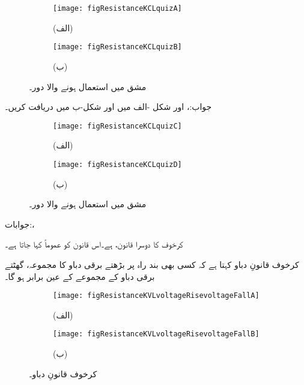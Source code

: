 \begin{figure}
\centering
\begin{subfigure}{0.34\textwidth}
\centering
\texttt{[image: figResistanceKCLquizA]}
\caption*{(الف)}
\end{subfigure}%
%
\begin{subfigure}{0.66\textwidth}
\centering
\texttt{[image: figResistanceKCLquizB]}
\caption*{(ب)}
\end{subfigure}%
\caption{مشق  میں استعمال ہونے والا دور۔}
\label{شکل_مزاحمتی_مشق_الف}
\end{figure}
جواب:،  اور 
\FloatBarrier
شکل -الف میں  اور شکل-ب میں  دریافت کریں۔
\begin{figure}[!h]
\centering
\begin{subfigure}{0.4\textwidth}
\centering
\texttt{[image: figResistanceKCLquizC]}
\caption*{(الف)}
\end{subfigure}%
%
\begin{subfigure}[scale=0.8]{0.6\textwidth}
\centering
\texttt{[image: figResistanceKCLquizD]}
\caption*{(ب)}
\end{subfigure}%
\caption{مشق  میں استعمال ہونے والا دور۔}
\label{شکل_مزاحمتی_مشق_ب}
\end{figure}

جوابات:، 
\FloatBarrier

کرخوف کا دوسرا قانون،   ہے۔اس قانون کو عموماً  کہا جاتا ہے۔

کرخوف قانونِ دباو کہتا ہے کہ کسی بھی بند راہ پر بڑھتے برقی دباو کا مجموعہ، گھٹتے برقی دباو کے مجموعے کے عین برابر ہو گا۔

\begin{figure}
\centering
\begin{subfigure}{0.5\textwidth}
\centering
\texttt{[image: figResistanceKVLvoltageRisevoltageFallA]}
\caption*{(الف)}
\end{subfigure}%
%
\begin{subfigure}{0.5\textwidth}
\centering
\texttt{[image: figResistanceKVLvoltageRisevoltageFallB]}
\caption*{(ب)}
\end{subfigure}%
\caption{کرخوف قانونِ دباو۔}
\label{شکل_مزاحمتی_قانون_دباو}
\end{figure}

